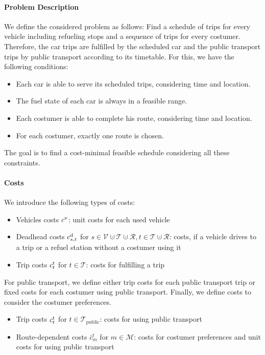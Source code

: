 \paragraph{Problem Description} \parfill

We define the considered problem as follows: Find a schedule of trips for every vehicle including refueling stops and a sequence of trips for every costumer. Therefore, the car trips are fulfilled by the scheduled car and the public transport trips by public transport according to its timetable. For this, we have the following conditions:

\begin{itemize}
	\item{Each car is able to serve its scheduled trips, considering time and location.}
	\item{The fuel state of each car is always in a feasible range.}
	\item{Each costumer is able to complete his route, considering time and location.}
	\item{For each costumer, exactly one route is chosen.}
\end{itemize}

The goal is to find a cost-minimal feasible schedule considering all these constraints.

\paragraph{Costs} \parfill

We introduce the following types of costs:
\begin{itemize}
	\item{Vehicles costs $c^{\operatorname{v}}$: unit costs for each used vehicle}
	\item{Deadhead costs $c^{\operatorname{d}}_{s,t}$ for $s\in\mathcal{V}\cupdot\mathcal{T}\cupdot\mathcal{R}, t\in\mathcal{T}\cupdot\mathcal{R}$: costs, if a vehicle drives to a trip or a refuel station without a costumer using it}
	\item{Trip costs $c^{\operatorname{t}}_t$ for $t\in\mathcal{T}$: costs for fulfilling a trip}
\end{itemize}

For public transport, we define either trip costs for each public transport trip or fixed costs for each costumer using public transport. Finally, we define costs to consider the costumer preferences.
\begin{itemize}
	\item{Trip costs $c^{\operatorname{t}}_t$ for $t\in\mathcal{T}_{\operatorname{public}}$: costs for using public transport}
	\item{Route-dependent costs $\bar{c}^{\operatorname{r}}_m$ for $m\in\mathcal{M}$: costs for costumer preferences and unit costs for using public transport}
\end{itemize}

